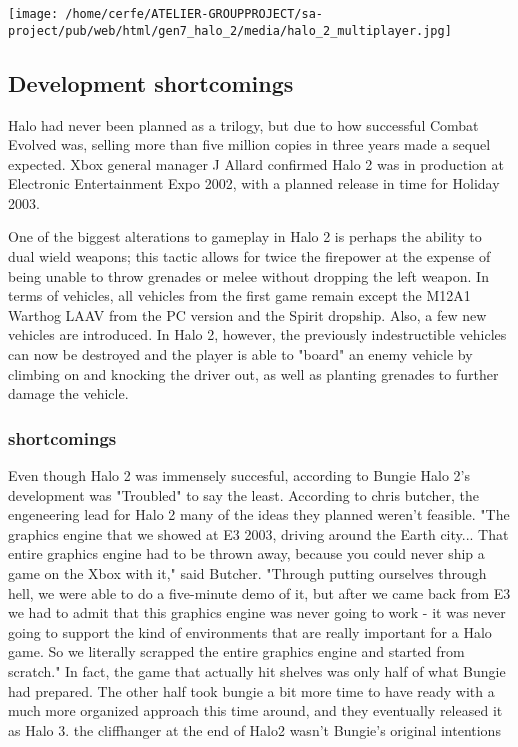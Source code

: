 \documentclass[a4paper,10pt]{book}
\begin{document}
 \texttt{[image: /home/cerfe/ATELIER-GROUPPROJECT/sa-project/pub/web/html/gen7\_halo\_2/media/halo\_2\_multiplayer.jpg]}
 \subsection{Development  shortcomings }
 
          Halo had never been planned as a trilogy, but due to how successful  Combat Evolved was, selling more than five million copies in three years made a sequel expected. Xbox general manager J Allard confirmed Halo 2 was in production at Electronic Entertainment Expo 2002,
          with a planned release in time for Holiday 2003.
         
 
          One of the biggest alterations to gameplay in Halo 2 is perhaps the ability to dual wield weapons; this tactic allows for twice the firepower at the expense of being unable to throw grenades or melee without dropping the left weapon. 
          In terms of vehicles, all vehicles from the first game remain except the M12A1 Warthog LAAV from the PC version and the Spirit dropship. Also, a few new vehicles are introduced. In Halo 2, however,
          the previously indestructible vehicles can now be destroyed and the player is able to "board" an enemy vehicle by climbing on and knocking the driver out, as well as planting grenades to further damage the vehicle.
         
 
 \subsubsection{shortcomings }
 
          Even though Halo 2 was immensely succesful, according to Bungie Halo 2's development was "Troubled" to say the least. According  to chris butcher, the engeneering lead for Halo 2
          many of the ideas they planned weren't feasible. "The graphics engine that we showed at E3 2003, driving around the Earth city... That entire graphics engine had to be thrown away,
          because you could never ship a game on the Xbox with it," said Butcher. "Through putting ourselves through hell, we were able to do a five-minute demo of it, but after we came back from E3
          we had to admit that this graphics engine was never going to work - it was never going to support the kind of environments that are really important for a Halo game. So we literally scrapped
          the entire graphics engine and started from scratch." In fact, the game that actually hit shelves was only half of what Bungie had prepared. The other half took bungie a bit more time 
          to have ready with a much more organized approach this time around, and they eventually released it as Halo 3. the cliffhanger at the end of Halo2 wasn't Bungie's original intentions
         
\end{document}
